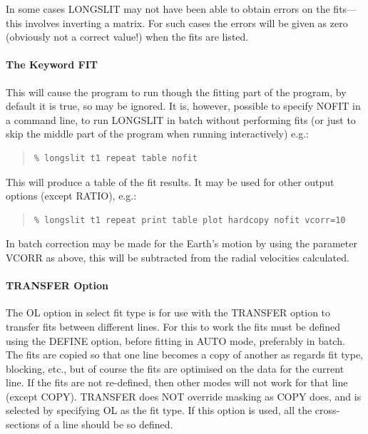 In some cases LONGSLIT may not have been able to obtain errors on the
fits---this involves inverting a matrix.
For such cases the errors will be given as zero (obviously not a correct
value!) when the fits are listed.

\paragraph{The Keyword FIT}
\label{long.fit}

This will cause the program to run though the fitting part of the
program, by default it is true, so may be ignored. It is, however,
possible to specify NOFIT in a command line, to run LONGSLIT in batch
without performing fits (or just to skip the middle part of the program
when running interactively) e.g.:

\begin{quote}\begin{verbatim}
% longslit t1 repeat table nofit
\end{verbatim}\end{quote}

This will produce a table of the fit results.
It may be used for other output options (except RATIO), e.g.:

\begin{quote}\begin{verbatim}
% longslit t1 repeat print table plot hardcopy nofit vcorr=10
\end{verbatim}\end{quote}

In batch correction may be made for the Earth's motion by using the
parameter VCORR as above, this will be subtracted from the radial
velocities calculated.

\paragraph{TRANSFER Option}

The OL option in select fit type is for use with the TRANSFER option to
transfer fits between different lines. For this to work the fits must
be defined using the DEFINE option, before fitting in AUTO mode,
preferably in batch. The fits are copied so that one line becomes a
copy of another as regards fit type, blocking, etc., but of course the
fits are optimised on the data for the current line. If the fits are
not re-defined, then other modes will not work for that line (except
COPY). TRANSFER does NOT override masking as COPY does, and is selected
by specifying OL as the fit type.
If this option is used, all the cross-sections of a line should be so
defined.

